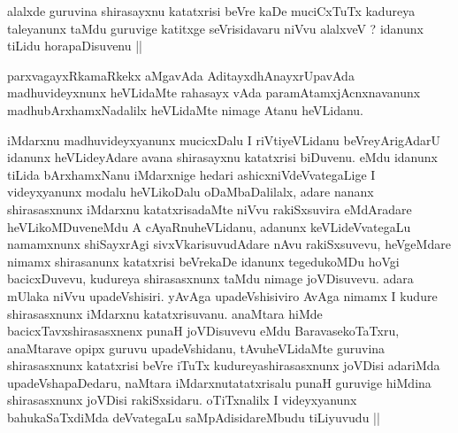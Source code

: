 \begin{artha}
alalxde guruvina shirasayxnu katatxrisi beVre kaDe muciCxTuTx kadureya taleyanunx taMdu guruvige katitxge seVrisidavaru niVvu alalxveV ? idanunx tiLidu horapaDisuvenu ||
\end{artha}

\begin{artha}
parxvagayxRkamaRkekx aMgavAda AditayxdhAnayxrUpavAda madhuvideyxnunx heVLidaMte rahasayx vAda paramAtamxjAcnxnavanunx madhubArxhamxNadalilx heVLidaMte nimage Atanu heVLidanu.
\end{artha}

\begin{center}
\end{center}

\begin{artha}
iMdarxnu madhuvideyxyanunx mucicxDalu I riVtiyeVLidanu beVreyArigAdarU idanunx heVLideyAdare avana shirasayxnu katatxrisi biDuvenu. eMdu idanunx tiLida bArxhamxNanu iMdarxnige hedari ashicxniVdeVvategaLige I videyxyanunx modalu heVLikoDalu oDaMbaDalilalx, adare nananx shirasasxnunx iMdarxnu katatxrisadaMte niVvu rakiSxsuvira eMdAradare heVLikoMDuveneMdu A cAyaRnuheVLidanu, adanunx keVLideVvategaLu namamxnunx shiSayxrAgi sivxVkarisuvudAdare nAvu rakiSxsuvevu, heVgeMdare nimamx shirasanunx katatxrisi beVrekaDe idanunx tegedukoMDu hoVgi bacicxDuvevu, kudureya shirasasxnunx taMdu nimage joVDisuvevu. adara mUlaka niVvu upadeVshisiri. yAvAga upadeVshisiviro AvAga nimamx I kudure shirasasxnunx iMdarxnu katatxrisuvanu. anaMtara hiMde bacicxTavxshirasasxnenx punaH joVDisuvevu eMdu BaravasekoTaTxru, anaMtarave opipx guruvu upadeVshidanu, tAvuheVLidaMte guruvina shirasasxnunx katatxrisi beVre iTuTx kudureyashirasasxnunx joVDisi adariMda upadeVshapaDedaru, naMtara iMdarxnutatatxrisalu punaH guruvige  hiMdina shirasasxnunx joVDisi rakiSxsidaru. oTiTxnalilx I videyxyanunx bahukaSaTxdiMda deVvategaLu saMpAdisidareMbudu tiLiyuvudu ||
\end{artha}

